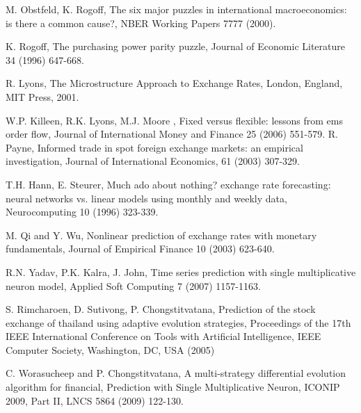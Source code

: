 
\begin{thebibliography}{00}


 M. Obstfeld, K. Rogoff,
             The six major puzzles in international macroeconomics: is there a common cause?, NBER Working Papers 7777 (2000).

 K. Rogoff,
             The purchasing power parity puzzle,
             Journal of Economic Literature 34 (1996) 647-668.

 R. Lyons,
             The Microstructure Approach to Exchange Rates,
             London, England, MIT Press, 2001.

 W.P. Killeen, R.K. Lyons, M.J. Moore ,
             Fixed versus flexible: lessons from ems order flow,
             Journal of International Money and Finance 25 (2006) 551-579.
 R. Payne,
             Informed trade in spot foreign exchange markets: an empirical investigation,
             Journal of International Economics, 61 (2003) 307-329.

 T.H. Hann, E. Steurer, Much ado about nothing? exchange rate forecasting: neural networks vs. linear models using
monthly and weekly data, Neurocomputing 10 (1996) 323-339.


 M. Qi and Y. Wu,
Nonlinear prediction of exchange rates with monetary
fundamentals, Journal of Empirical Finance 10 (2003) 623-640.

 R.N. Yadav, P.K. Kalra, J. John,
Time series prediction with single multiplicative neuron model,
Applied Soft Computing 7 (2007) 1157-1163.


S. Rimcharoen, D. Sutivong, P. Chongstitvatana, Prediction of the
stock exchange of thailand using adaptive evolution strategies,
Proceedings of the 17th IEEE International Conference on Tools with
Artificial Intelligence, IEEE Computer Society, Washington, DC, USA
(2005)

 C. Worasucheep and P. Chongstitvatana,
A multi-strategy differential evolution algorithm for financial,
Prediction with Single Multiplicative Neuron, ICONIP 2009, Part
II, LNCS 5864 (2009) 122-130. 


\end{thebibliography}
